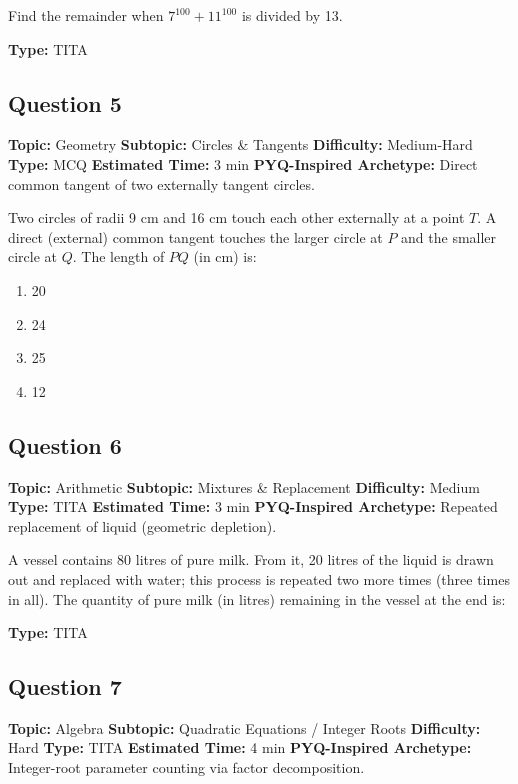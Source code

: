 \documentclass[11pt]{article}
\begin{document}
\begin{tcolorbox}
Find the remainder when \(7^{100} + 11^{100}\) is divided by 13.
\end{tcolorbox}

\textbf{Type:} TITA

\subsection*{Question 5}
\textbf{Topic:} Geometry \quad
\textbf{Subtopic:} Circles \& Tangents \quad
\textbf{Difficulty:} Medium-Hard \quad
\textbf{Type:} MCQ \quad
\textbf{Estimated Time:} 3 min \quad
\textbf{PYQ-Inspired Archetype:} Direct common tangent of two externally tangent circles.

\begin{tcolorbox}
Two circles of radii 9 cm and 16 cm touch each other externally at a point \(T\). A direct (external) common tangent touches the larger circle at \(P\) and the smaller circle at \(Q\). The length of \(PQ\) (in cm) is:
\end{tcolorbox}

\begin{enumerate}[label=(\Alph*)]
\item 20
\item 24
\item 25
\item 12
\end{enumerate}

\subsection*{Question 6}
\textbf{Topic:} Arithmetic \quad
\textbf{Subtopic:} Mixtures \& Replacement \quad
\textbf{Difficulty:} Medium \quad
\textbf{Type:} TITA \quad
\textbf{Estimated Time:} 3 min \quad
\textbf{PYQ-Inspired Archetype:} Repeated replacement of liquid (geometric depletion).

\begin{tcolorbox}
A vessel contains 80 litres of pure milk. From it, 20 litres of the liquid is drawn out and replaced with water; this process is repeated two more times (three times in all). The quantity of pure milk (in litres) remaining in the vessel at the end is:
\end{tcolorbox}

\textbf{Type:} TITA

\subsection*{Question 7}
\textbf{Topic:} Algebra \quad
\textbf{Subtopic:} Quadratic Equations / Integer Roots \quad
\textbf{Difficulty:} Hard \quad
\textbf{Type:} TITA \quad
\textbf{Estimated Time:} 4 min \quad
\textbf{PYQ-Inspired Archetype:} Integer-root parameter counting via factor decomposition.
\end{document}
